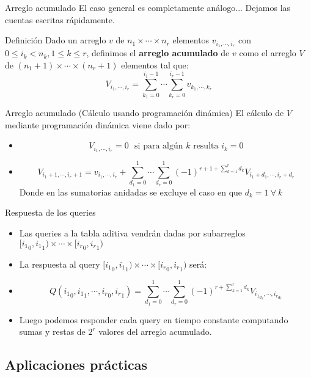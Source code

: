 \documentclass{beamer}
\begin{document}
\begin{frame}{Arreglo acumulado}
    El caso general es completamente análogo... Dejamos las cuentas escritas rápidamente.
   \begin{block}{Definición}
      Dado un arreglo $v$ de $n_1 \times \cdots \times n_r$ elementos $v_{i_1,\cdots,i_r}$ con $0 \leq i_k < n_k, 1\leq k \leq r$, 
      definimos el \textbf{arreglo acumulado} de $v$ como el arreglo $V$ de $(n_1+1) \times \cdots \times (n_r+1)$ elementos
      tal que:
      $$V_{i_1,\cdots,i_r} = \sum_{k_1=0}^{i_1-1} \cdots \sum_{k_r=0}^{i_r-1}{v_{k_1,\cdots,k_r}}$$
  \end{block}
\end{frame}
\begin{frame}{Arreglo acumulado (Cálculo usando programación dinámica)}
   El cálculo de $V$ mediante programación dinámica viene dado por:
      \begin{itemize}
        \item $$V_{i_1, \cdots, i_r} = 0\ \ \ \mbox{si para algún $k$ resulta $i_k = 0$}$$
        \item $$V_{i_1+1,\cdots,i_r+1} = v_{i_1,\cdots,i_r} + \sum_{d_1=0}^1 \cdots \sum_{d_r=0}^1 {(-1)^{r+1 + \sum\limits_{k=1}^r{d_k}}V_{i_1+d_1,\cdots,i_r+d_r}}$$
                Donde en las sumatorias anidadas se excluye el caso en que $d_k = 1 \ \forall\ k$
      \end{itemize}
\end{frame}

\begin{frame}{Respuesta de los queries}
  \begin{itemize}
  \item Las queries a la tabla aditiva vendrán dadas por subarreglos $[{i_1}_0,{i_1}_1) \times \cdots \times [{i_r}_0,{i_r}_1)$
  \item La respuesta al query $[{i_1}_0,{i_1}_1) \times \cdots \times [{i_r}_0,{i_r}_1)$ será:
    \item
    $$Q({i_1}_0,{i_1}_1, \cdots ,{i_r}_0,{i_r}_1) = \sum_{d_1=0}^1 \cdots \sum_{d_r=0}^1 {(-1)^{r + \sum\limits_{k=1}^r{d_k}}V_{{i_1}_{d_1},\cdots,{i_r}_{d_r}}}$$
    \item Luego podemos responder cada query en tiempo constante computando sumas y restas de $2^r$ valores del arreglo acumulado.
  \end{itemize}
\end{frame}

\subsection{Aplicaciones prácticas}
\end{document}

